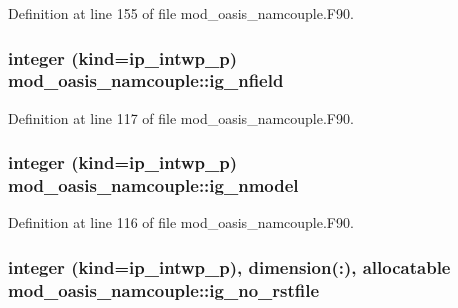 Definition at line 155 of file mod\+\_\+oasis\+\_\+namcouple.\+F90.

\hypertarget{classmod__oasis__namcouple_a674f201daa7f2e1ba4c71221bda91d9c}{
\subsubsection[{ig\+\_\+nfield}]{\setlength{\rightskip}{0pt plus 5cm}integer (kind=ip\+\_\+intwp\+\_\+p) mod\+\_\+oasis\+\_\+namcouple\+::ig\+\_\+nfield\hspace{0.3cm}{\ttfamily [private]}}}\label{classmod__oasis__namcouple_a674f201daa7f2e1ba4c71221bda91d9c}


Definition at line 117 of file mod\+\_\+oasis\+\_\+namcouple.\+F90.

\hypertarget{classmod__oasis__namcouple_ac66a16e4153939c774a0b9a2854e6663}{
\subsubsection[{ig\+\_\+nmodel}]{\setlength{\rightskip}{0pt plus 5cm}integer (kind=ip\+\_\+intwp\+\_\+p) mod\+\_\+oasis\+\_\+namcouple\+::ig\+\_\+nmodel\hspace{0.3cm}{\ttfamily [private]}}}\label{classmod__oasis__namcouple_ac66a16e4153939c774a0b9a2854e6663}


Definition at line 116 of file mod\+\_\+oasis\+\_\+namcouple.\+F90.

\hypertarget{classmod__oasis__namcouple_a1cc3d37d7819c112f14b6cec03266561}{
\subsubsection[{ig\+\_\+no\+\_\+rstfile}]{\setlength{\rightskip}{0pt plus 5cm}integer (kind=ip\+\_\+intwp\+\_\+p), dimension(\+:), allocatable mod\+\_\+oasis\+\_\+namcouple\+::ig\+\_\+no\+\_\+rstfile\hspace{0.3cm}{\ttfamily [private]}}}\label{classmod__oasis__namcouple_a1cc3d37d7819c112f14b6cec03266561}



